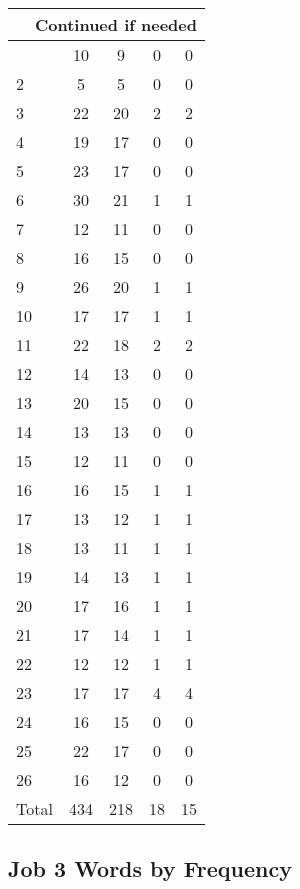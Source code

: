 \begin{center}
\begin{longtable}{l|c|c|c|c}
\hline \multicolumn{5}{|r|}{{Continued if needed}} \\ \hline
\endfoot 
1 & 10 & 9 & 0 & 0\\ \hline
2 & 5 & 5 & 0 & 0\\ \hline
3 & 22 & 20 & 2 & 2\\ \hline
4 & 19 & 17 & 0 & 0\\ \hline
5 & 23 & 17 & 0 & 0\\ \hline
6 & 30 & 21 & 1 & 1\\ \hline
7 & 12 & 11 & 0 & 0\\ \hline
8 & 16 & 15 & 0 & 0\\ \hline
9 & 26 & 20 & 1 & 1\\ \hline
10 & 17 & 17 & 1 & 1\\ \hline
11 & 22 & 18 & 2 & 2\\ \hline
12 & 14 & 13 & 0 & 0\\ \hline
13 & 20 & 15 & 0 & 0\\ \hline
14 & 13 & 13 & 0 & 0\\ \hline
15 & 12 & 11 & 0 & 0\\ \hline
16 & 16 & 15 & 1 & 1\\ \hline
17 & 13 & 12 & 1 & 1\\ \hline
18 & 13 & 11 & 1 & 1\\ \hline
19 & 14 & 13 & 1 & 1\\ \hline
20 & 17 & 16 & 1 & 1\\ \hline
21 & 17 & 14 & 1 & 1\\ \hline
22 & 12 & 12 & 1 & 1\\ \hline
23 & 17 & 17 & 4 & 4\\ \hline
24 & 16 & 15 & 0 & 0\\ \hline
25 & 22 & 17 & 0 & 0\\ \hline
26 & 16 & 12 & 0 & 0\\ \hline
Total & 434 & 218 & 18 & 15
\end{longtable}
\end{center}





\subsection{Job 3 Words by Frequency}


\normalsize
 
